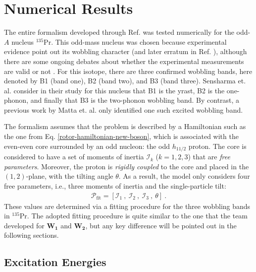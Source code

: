 \section{Numerical Results}
\label{numerical-results-new-boson}

The entire formalism developed through Ref. \cite{raduta2020new} was tested numerically for the odd-$A$ nucleus $^{135}$Pr. This odd-mass nucleus was chosen because experimental evidence point out its wobbling character \cite{matta2017transverse} (and later erratum in Ref. \cite{matta2021erratum}), although there are some ongoing debates about whether the experimental measurements are valid or not \cite{guo2021comment}. For this isotope, there are three confirmed wobbling bands, here denoted by B1 (band one), B2 (band two), and B3 (band three). Sensharma et. al. \cite{sensharma2019two} consider in their study for this nucleus that B1 is the yrast, B2 is the one-phonon, and finally that B3 is the two-phonon wobbling band. By contrast, a previous work by Matta et. al. \cite{matta2017transverse} only identified one such excited wobbling band.

The formalism assumes that the problem is described by a Hamiltonian such as the one from Eq. \ref{rotor-hamiltonian-new-boson}, which is associated with the even-even core surrounded by an odd nucleon: the odd $h_{11/2}$ proton. The core is considered to have a set of moments of inertia $\mathcal{I}_k$ ($k=1,2,3$) that are \emph{free parameters}. Moreover, the proton is \emph{rigidly coupled} to the core and placed in the $(1,2)$-plane, with the tilting angle $\theta$. As a result, the model only considers four free parameters, i.e., three moments of inertia and the single-particle tilt:
\begin{align}
    \mathcal{P}_\text{fit}=\left[\mathcal{I}_1\ ,\ \mathcal{I}_2\ ,\ \mathcal{I}_3\ ,\ \theta\right]\ .
\end{align}
These values are determined via a fitting procedure for the three wobbling bands in $^{135}$Pr. The adopted fitting procedure is quite similar to the one that the team developed for $\mathbf{W_1}$ and $\mathbf{W_2}$, but any key difference will be pointed out in the following sections.

\subsection{Excitation Energies}

